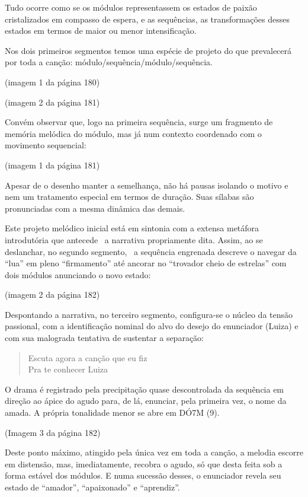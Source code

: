 Tudo ocorre como se os módulos representassem os estados de paixão
cristalizados em compasso de espera, e as sequências, as transformações
desses estados em termos de maior ou menor intensificação.

Nos dois primeiros segmentos temos uma espécie de projeto do que
prevalecerá por toda a canção: módulo/sequência/módulo/sequência.

(imagem 1 da página 180)

(imagem 2 da página 181)

Convém observar que, logo na primeira sequência, surge um fragmento de
memória melódica do módulo, mas já num contexto coordenado com o
movimento sequencial:

(imagem 1 da página 181)

Apesar de o desenho manter a semelhança, não há pausas isolando o motivo
e nem um tratamento especial em termos de duração. Suas sílabas são
pronunciadas com a mesma dinâmica das demais.

Este projeto melódico inicial está em sintonia com a extensa metáfora
introdutória que antecede~ a narrativa propriamente dita. Assim, ao se
deslanchar, no segundo segmento,~ a sequência engrenada descreve o
navegar da ``lua'' em pleno ``firmamento'' até ancorar no ``trovador
cheio de estrelas'' com dois módulos anunciando o novo estado:

(imagem 2 da página 182)

Despontando a narrativa, no terceiro segmento, configura-se o núcleo da
tensão passional, com a identificação nominal do alvo do desejo do
enunciador (Luiza) e com sua malograda tentativa de sustentar a
separação:

\begin{verse}
Escuta agora a canção que eu fiz\\
Pra te conhecer Luiza
\end{verse}

O drama é registrado pela precipitação quase descontrolada da sequência
em direção ao ápice do agudo para, de lá, enunciar, pela primeira vez, o
nome da amada. A própria tonalidade menor se abre em DÓ7M (9).

(Imagem 3 da página 182)

Deste ponto máximo, atingido pela única vez em toda a canção, a melodia
escorre em distensão, mas, imediatamente, recobra o agudo, só que desta
feita sob a forma estável dos módulos. E numa sucessão desses, o
enunciador revela seu estado de ``amador'', ``apaixonado'' e
``aprendiz''.~


